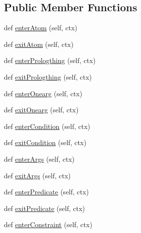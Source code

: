 \subsection*{Public Member Functions}
\begin{DoxyCompactItemize}
\item 
def \hyperlink{class_prolog_rules_listener_1_1_prolog_rules_listener_abbc3ef4ec1f3811b9dd194936167274f}{enter\+Atom} (self, ctx)
\item 
def \hyperlink{class_prolog_rules_listener_1_1_prolog_rules_listener_a7297673a5e8385d0c2a8ca84b575bcea}{exit\+Atom} (self, ctx)
\item 
def \hyperlink{class_prolog_rules_listener_1_1_prolog_rules_listener_a9380123ed4e178b1f5b619c4e319ea87}{enter\+Prologthing} (self, ctx)
\item 
def \hyperlink{class_prolog_rules_listener_1_1_prolog_rules_listener_a74dbe4f70addf7a4190c866d340fff39}{exit\+Prologthing} (self, ctx)
\item 
def \hyperlink{class_prolog_rules_listener_1_1_prolog_rules_listener_a60572c757692f9b6e26672d7f39501ca}{enter\+Onearg} (self, ctx)
\item 
def \hyperlink{class_prolog_rules_listener_1_1_prolog_rules_listener_aed52a06263d91850489facb20ff1f058}{exit\+Onearg} (self, ctx)
\item 
def \hyperlink{class_prolog_rules_listener_1_1_prolog_rules_listener_a5c8579ae8229948a9bf6a1ae1f0ffbad}{enter\+Condition} (self, ctx)
\item 
def \hyperlink{class_prolog_rules_listener_1_1_prolog_rules_listener_a3152b60eaee48ad32f9d60a1c02435ab}{exit\+Condition} (self, ctx)
\item 
def \hyperlink{class_prolog_rules_listener_1_1_prolog_rules_listener_a4d3020bfe94a32d003244722079db05a}{enter\+Args} (self, ctx)
\item 
def \hyperlink{class_prolog_rules_listener_1_1_prolog_rules_listener_a65394b5be33b666c136eebf315c7f271}{exit\+Args} (self, ctx)
\item 
def \hyperlink{class_prolog_rules_listener_1_1_prolog_rules_listener_ac7417bc12af903607d631814533a6d21}{enter\+Predicate} (self, ctx)
\item 
def \hyperlink{class_prolog_rules_listener_1_1_prolog_rules_listener_abc1bda2fbeb65b2962bca1a3b4ec834f}{exit\+Predicate} (self, ctx)
\item 
def \hyperlink{class_prolog_rules_listener_1_1_prolog_rules_listener_a9b9cae2c94ac78e0f14559b7d750c8e0}{enter\+Constraint} (self, ctx)
\item 

\end{DoxyCompactItemize}

